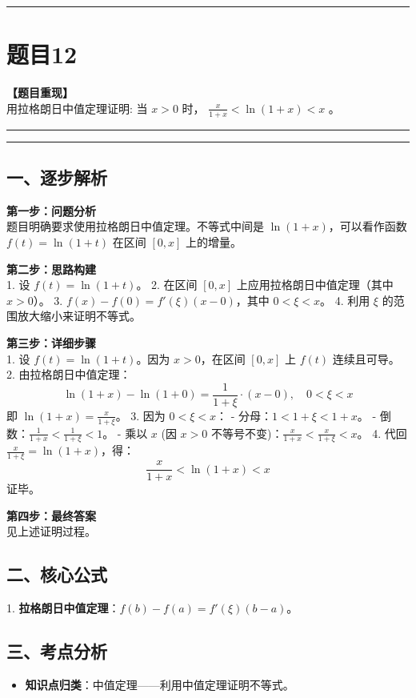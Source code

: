 \documentclass[12pt, a4paper]{ctexart}
\newcommand{\TopSeparator}{
    \par\noindent\rule{\textwidth}{1.5pt}\vspace{0.5em} %
}
\newcommand{\AnalysisSeparator}{
    \par\noindent\rule{\textwidth}{0.5pt}\vspace{0.2em}\hrule\vspace{0.5em} %
}
\newenvironment{RedAnalysis}{
    \par
    \color{red} %
}{
    \par
    \color{black} %
}
\begin{document}
\vspace{2em}

\TopSeparator
\section*{题目12}

\textbf{【题目重现】} \\
用拉格朗日中值定理证明: 当 $x>0$ 时， $ \frac{x}{1+x}<\ln(1+x)<x $ 。

\AnalysisSeparator

\begin{RedAnalysis}

\subsection*{一、逐步解析}

\textbf{第一步：问题分析} \\
题目明确要求使用拉格朗日中值定理。不等式中间是 $\ln(1+x)$，可以看作函数 $f(t) = \ln(1+t)$ 在区间 $[0, x]$ 上的增量。

\textbf{第二步：思路构建} \\
1. 设 $f(t) = \ln(1+t)$。
2. 在区间 $[0, x]$ 上应用拉格朗日中值定理（其中 $x>0$）。
3. $f(x) - f(0) = f'(\xi)(x-0)$，其中 $0 < \xi < x$。
4. 利用 $\xi$ 的范围放大缩小来证明不等式。

\textbf{第三步：详细步骤} \\
1. 设 $f(t) = \ln(1+t)$。因为 $x>0$，在区间 $[0, x]$ 上 $f(t)$ 连续且可导。
2. 由拉格朗日中值定理：
   \[ \ln(1+x) - \ln(1+0) = \frac{1}{1+\xi} \cdot (x - 0), \quad 0 < \xi < x \]
   即 $\ln(1+x) = \frac{x}{1+\xi}$。
3. 因为 $0 < \xi < x$：
   - 分母：$1 < 1+\xi < 1+x$。
   - 倒数：$\frac{1}{1+x} < \frac{1}{1+\xi} < 1$。
   - 乘以 $x$ (因 $x>0$ 不等号不变)：$\frac{x}{1+x} < \frac{x}{1+\xi} < x$。
4. 代回 $\frac{x}{1+\xi} = \ln(1+x)$，得：
   \[ \frac{x}{1+x} < \ln(1+x) < x \]
   证毕。

\textbf{第四步：最终答案} \\
见上述证明过程。

\subsection*{二、核心公式}
1. \textbf{拉格朗日中值定理}：$f(b)-f(a) = f'(\xi)(b-a)$。

\subsection*{三、考点分析}
\begin{itemize}
    \item \textbf{知识点归类}：中值定理——利用中值定理证明不等式。
\end{itemize}

\end{RedAnalysis}
\end{document}
